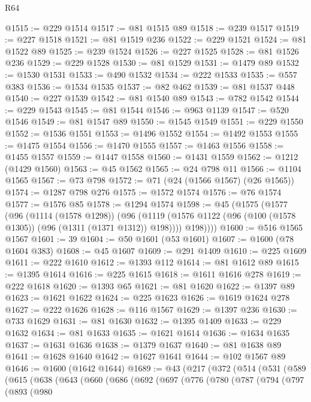 \begin{lexlean}{R64}
\begin{coremodule}
@1515 := @229 @1514
@1517 := @81 @1515 @89
@1518 := @239 @1517
@1519 := @227 @1518
@1521 := @81 @1519 @236
@1522 := @229 @1521
@1524 := @81 @1522 @89
@1525 := @239 @1524
@1526 := @227 @1525
@1528 := @81 @1526 @236
@1529 := @229 @1528
@1530 := @81 @1529
@1531 := @1479 @89
@1532 := @1530 @1531
@1533 := @490 @1532
@1534 := @222 @1533
@1535 := @557 @383
@1536 := @1534 @1535
@1537 := @82 @462
@1539 := @81 @1537 @448
@1540 := @227 @1539
@1542 := @81 @1540 @89
@1543 := @782 @1542
@1544 := @229 @1543
@1545 := @81 @1544
@1546 := @963 @1139
@1547 := @520 @1546
@1549 := @81 @1547 @89
@1550 := @1545 @1549
@1551 := @229 @1550
@1552 := @1536 @1551
@1553 := @1496 @1552
@1554 := @1492 @1553
@1555 := @1475 @1554
@1556 := @1470 @1555
@1557 := @1463 @1556
@1558 := @1455 @1557
@1559 := @1447 @1558
@1560 := @1431 @1559
@1562 := @1212 (@1429 @1560)
@1563 := @45 @1562
@1565 := @24 @798 @11
@1566 := @1104 @1565
@1567 := @73 @798
@1572 := @71 (@24 (@1566 @1567) (@26 @1565))
@1574 := @1287 @798 @276
@1575 := @1572 @1574
@1576 := @76 @1574
@1577 := @1576 @85
@1578 := @1294 @1574
@1598 := @45
    (@1575
      (@1577
        (@96
          (@1114 (@1578 @1298))
          (@96
            (@1119 (@1576 @1122 (@96 (@100 (@1578 @1305)) (@96 (@1311 (@1371 @1312)) @198))))
            @198))))
@1600 := @516 @1565 @1567
@1601 := 39
@1604 := @50 @1601 (@53 @1601)
@1607 := @1600 (@78 @1604 @383)
@1608 := @45 @1607
@1609 := @291 @1409
@1610 := @225 @1609
@1611 := @222 @1610
@1612 := @1393 @112
@1614 := @81 @1612 @89
@1615 := @1395 @1614
@1616 := @225 @1615
@1618 := @1611 @1616 @278
@1619 := @222 @1618
@1620 := @1393 @65
@1621 := @81 @1620
@1622 := @1397 @89
@1623 := @1621 @1622
@1624 := @225 @1623
@1626 := @1619 @1624 @278
@1627 := @222 @1626
@1628 := @116 @1567
@1629 := @1397 @236
@1630 := @733 @1629
@1631 := @81 @1630
@1632 := @1395 @1409
@1633 := @229 @1632
@1634 := @81 @1633
@1635 := @1621 @1614
@1636 := @1634 @1635
@1637 := @1631 @1636
@1638 := @1379 @1637
@1640 := @81 @1638 @89
@1641 := @1628 @1640
@1642 := @1627 @1641
@1644 := @102 @1567 @89
@1646 := @1600 (@1642 @1644)
@1689 := @43
    (@217
      (@372
        (@514
          (@531
            (@589
              (@615
                (@638
                  (@643
                    (@660
                      (@686
                        (@692
                          (@697
                            (@776
                              (@780
                                (@787
                                  (@794
                                    (@797
                                      (@893
                                        (@980

\end{coremodule}
\end{lexlean}
